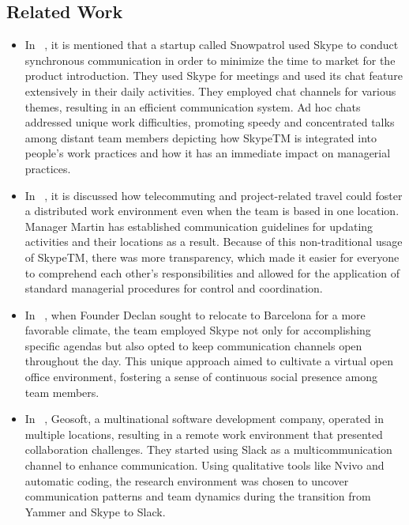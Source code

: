 \documentclass{llncs}
\begin{document}
\subsection{Related Work}
\begin{itemize}
    \item In ~\cite{refpaper8}, it is mentioned that a startup called Snowpatrol used Skype to conduct synchronous communication in order to minimize the time to market for the product introduction. They used Skype for meetings and used its chat feature extensively in their daily activities. They employed chat channels for various themes, resulting in an efficient communication system. Ad hoc chats addressed unique work difficulties, promoting speedy and concentrated talks among distant team members depicting how SkypeTM is integrated into people's work practices and how it has an immediate impact on managerial practices.\\
    \item In ~\cite{refpaper8}, it is discussed how telecommuting and project-related travel could foster a distributed work environment even when the team is based in one location. Manager Martin has established communication guidelines for updating activities and their locations as a result. Because of this non-traditional usage of SkypeTM, there was more transparency, which made it easier for everyone to comprehend each other's responsibilities and allowed for the application of standard managerial procedures for control and coordination. \\ 
    \item In ~\cite{refpaper8}, when Founder Declan sought to relocate to Barcelona for a more favorable climate, the team employed Skype not only for accomplishing specific agendas but also opted to keep communication channels open throughout the day. This unique approach aimed to cultivate a virtual open office environment, fostering a sense of continuous social presence among team members.\\
    \item In ~\cite{refpaper9}, Geosoft, a multinational software development company, operated in multiple locations, resulting in a remote work environment that presented collaboration challenges. They started using Slack as a multicommunication channel to enhance communication. Using qualitative tools like Nvivo and automatic coding, the research environment was chosen to uncover communication patterns and team dynamics during the transition from Yammer and Skype to Slack.
\end{itemize}
\end{document}
